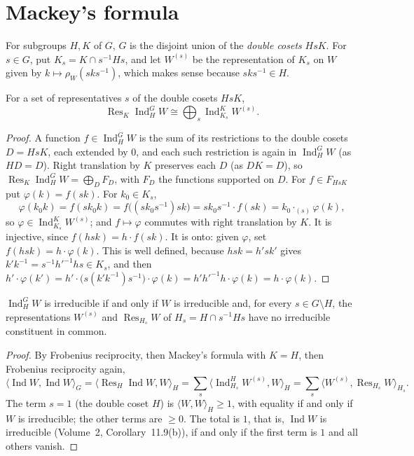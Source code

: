 \section{Mackey's formula}

For subgroups $H,K$ of $G$, $G$ is the disjoint union of the \emph{double cosets} $HsK$. For $s\in G$, put $K_s=K\cap s^{-1}Hs$, and let $W^{(s)}$ be the representation of $K_s$ on $W$ given by $k\mapsto\rho_W(sks^{-1})$, which makes
sense because $sks^{-1}\in H$.

\begin{theorem}[Mackey, 1951]\label{thm:mackey}
For a set of representatives $s$ of the double cosets $HsK$,
\[
\operatorname{Res}_K\operatorname{Ind}_H^GW\cong\bigoplus_{s}\operatorname{Ind}_{K_s}^KW^{(s)}.
\]
\end{theorem}

\begin{proof}
A function $f\in\operatorname{Ind}_H^GW$ is the sum of its restrictions to the double cosets $D=HsK$, each extended by $0$, and each such restriction is again in $\operatorname{Ind}_H^GW$ (as $HD=D$). Right translation by $K$
preserves each $D$ (as $DK=D$), so $\operatorname{Res}_K\operatorname{Ind}_H^GW=\bigoplus_DF_D$, with $F_D$ the functions supported on $D$. For $f\in F_{HsK}$ put $\varphi(k)=f(sk)$. For $k_0\in K_s$,
\[
\varphi(k_0k)=f(sk_0k)=f\bigl((sk_0s^{-1})sk\bigr)=sk_0s^{-1}\cdot f(sk)=k_0\cdot_{(s)}\varphi(k),
\]
so $\varphi\in\operatorname{Ind}_{K_s}^KW^{(s)}$; and $f\mapsto\varphi$ commutes with right translation by $K$. It is injective, since $f(hsk)=h\cdot f(sk)$. It is onto: given $\varphi$, set $f(hsk)=h\cdot\varphi(k)$. This is well defined, because
$hsk=h'sk'$ gives $k'k^{-1}=s^{-1}h'^{-1}hs\in K_s$, and then $h'\cdot\varphi(k')=h'\cdot\bigl(s(k'k^{-1})s^{-1}\bigr)\cdot\varphi(k)=h'h'^{-1}h\cdot\varphi(k)=h\cdot\varphi(k)$.
\end{proof}

\begin{corollary}\label{cor:mackeyirr}
$\operatorname{Ind}_H^GW$ is irreducible if and only if $W$ is irreducible and, for every $s\in G\setminus H$, the representations $W^{(s)}$ and $\operatorname{Res}_{H_s}W$ of $H_s=H\cap s^{-1}Hs$ have no irreducible constituent in common.
\end{corollary}

\begin{proof}
By Frobenius reciprocity, then Mackey's formula with $K=H$, then Frobenius reciprocity again,
\[
\langle\operatorname{Ind}W,\operatorname{Ind}W\rangle_G=\langle\operatorname{Res}_H\operatorname{Ind}W,W\rangle_H=\sum_s\langle\operatorname{Ind}_{H_s}^HW^{(s)},W\rangle_H=\sum_s\langle W^{(s)},\operatorname{Res}_{H_s}W\rangle_{H_s}.
\]
The term $s=1$ (the double coset $H$) is $\langle W,W\rangle_H\ge1$, with equality if and only if $W$ is irreducible; the other terms are $\ge0$. The total is $1$, that is, $\operatorname{Ind}W$ is irreducible (Volume~2, Corollary~11.9(b)), if and only
if the first term is $1$ and all others vanish.
\end{proof}

